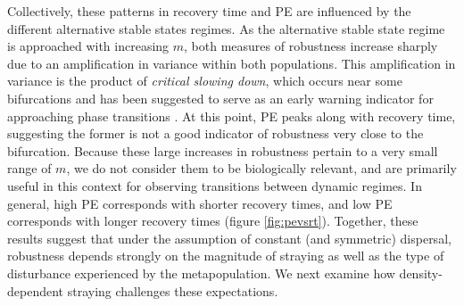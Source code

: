\documentclass{revtex4}
\begin{document}
Collectively, these patterns in recovery time and PE are influenced by the different alternative stable states regimes. 
As the alternative stable state regime is approached with increasing $m$, both measures of robustness increase sharply due to an amplification in variance within both populations.
This amplification in variance is the product of \emph{critical slowing down}, which occurs near some bifurcations \citep{Scheffer:2009gg} and has been suggested to serve as an early warning indicator for approaching phase transitions \citep{Scheffer:2009gg,Lade:2012eu,Anonymous:2013br,Dakos:2014br,Krkosek:2014ch}.
At this point, PE peaks along with recovery time, suggesting the former is not a good indicator of robustness very close to the bifurcation.
Because these large increases in robustness pertain to a very small range of $m$, we do not consider them to be biologically relevant, and are primarily useful in this context for observing transitions between dynamic regimes.
In general, high PE corresponds with shorter recovery times, and low PE corresponds with longer recovery times (figure \ref{fig:pevsrt}).
Together, these results suggest that under the assumption of constant (and symmetric) dispersal, robustness depends strongly on the magnitude of straying as well as the type of disturbance experienced by the metapopulation.
We next examine how density-dependent straying challenges these expectations.\\
\end{document}

